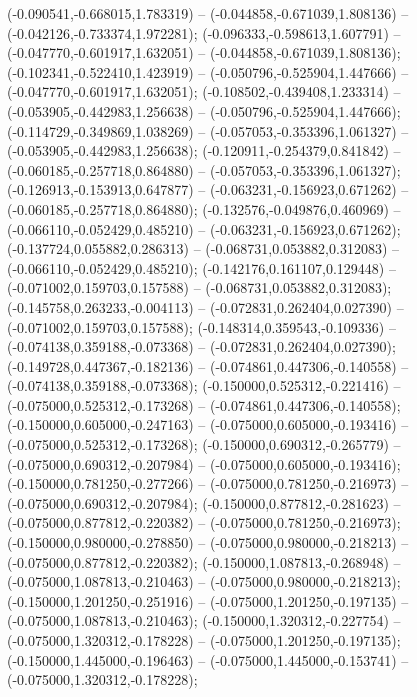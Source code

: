  (-0.090541,-0.668015,1.783319) -- (-0.044858,-0.671039,1.808136) -- (-0.042126,-0.733374,1.972281);
 (-0.096333,-0.598613,1.607791) -- (-0.047770,-0.601917,1.632051) -- (-0.044858,-0.671039,1.808136);
 (-0.102341,-0.522410,1.423919) -- (-0.050796,-0.525904,1.447666) -- (-0.047770,-0.601917,1.632051);
 (-0.108502,-0.439408,1.233314) -- (-0.053905,-0.442983,1.256638) -- (-0.050796,-0.525904,1.447666);
 (-0.114729,-0.349869,1.038269) -- (-0.057053,-0.353396,1.061327) -- (-0.053905,-0.442983,1.256638);
 (-0.120911,-0.254379,0.841842) -- (-0.060185,-0.257718,0.864880) -- (-0.057053,-0.353396,1.061327);
 (-0.126913,-0.153913,0.647877) -- (-0.063231,-0.156923,0.671262) -- (-0.060185,-0.257718,0.864880);
 (-0.132576,-0.049876,0.460969) -- (-0.066110,-0.052429,0.485210) -- (-0.063231,-0.156923,0.671262);
 (-0.137724,0.055882,0.286313) -- (-0.068731,0.053882,0.312083) -- (-0.066110,-0.052429,0.485210);
 (-0.142176,0.161107,0.129448) -- (-0.071002,0.159703,0.157588) -- (-0.068731,0.053882,0.312083);
 (-0.145758,0.263233,-0.004113) -- (-0.072831,0.262404,0.027390) -- (-0.071002,0.159703,0.157588);
 (-0.148314,0.359543,-0.109336) -- (-0.074138,0.359188,-0.073368) -- (-0.072831,0.262404,0.027390);
 (-0.149728,0.447367,-0.182136) -- (-0.074861,0.447306,-0.140558) -- (-0.074138,0.359188,-0.073368);
 (-0.150000,0.525312,-0.221416) -- (-0.075000,0.525312,-0.173268) -- (-0.074861,0.447306,-0.140558);
 (-0.150000,0.605000,-0.247163) -- (-0.075000,0.605000,-0.193416) -- (-0.075000,0.525312,-0.173268);
 (-0.150000,0.690312,-0.265779) -- (-0.075000,0.690312,-0.207984) -- (-0.075000,0.605000,-0.193416);
 (-0.150000,0.781250,-0.277266) -- (-0.075000,0.781250,-0.216973) -- (-0.075000,0.690312,-0.207984);
 (-0.150000,0.877812,-0.281623) -- (-0.075000,0.877812,-0.220382) -- (-0.075000,0.781250,-0.216973);
 (-0.150000,0.980000,-0.278850) -- (-0.075000,0.980000,-0.218213) -- (-0.075000,0.877812,-0.220382);
 (-0.150000,1.087813,-0.268948) -- (-0.075000,1.087813,-0.210463) -- (-0.075000,0.980000,-0.218213);
 (-0.150000,1.201250,-0.251916) -- (-0.075000,1.201250,-0.197135) -- (-0.075000,1.087813,-0.210463);
 (-0.150000,1.320312,-0.227754) -- (-0.075000,1.320312,-0.178228) -- (-0.075000,1.201250,-0.197135);
 (-0.150000,1.445000,-0.196463) -- (-0.075000,1.445000,-0.153741) -- (-0.075000,1.320312,-0.178228);
